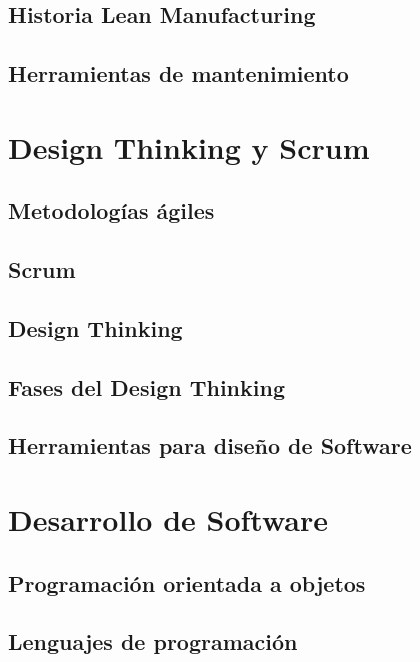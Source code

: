 \subsection{Historia Lean Manufacturing}

\subsection{Herramientas de mantenimiento}

\section{Design Thinking y Scrum}

\subsection{Metodologías ágiles}

\subsection{Scrum}

\subsection{Design Thinking}

\subsection{Fases del Design Thinking}

\subsection{Herramientas para diseño de Software}

\section{Desarrollo de Software}

\subsection{Programación orientada a objetos}

\subsection{Lenguajes de programación}

